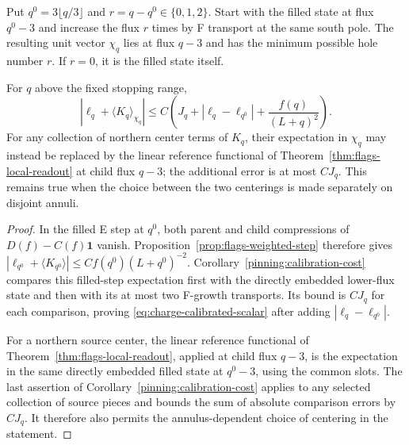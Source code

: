 Put $q^0=3\lfloor q/3\rfloor$ and $r=q-q^0\in\{0,1,2\}$.
Start with the filled state at flux $q^0-3$ and increase the flux
$r$ times by F transport at the same south pole.  The resulting unit
vector $\chi_q$ lies at flux $q-3$ and has the minimum possible hole
number $r$.  If $r=0$, it is the filled state itself.

\begin{lemma}\label{lem:charge-calibration}
For $q$ above the fixed stopping range,
\begin{equation}\label{eq:charge-calibrated-scalar}
 \left|\ell_q+\langle K_q\rangle_{\chi_q}\right|
 \le C\left(J_q+|\ell_q-\ell_{q^0}|
              +\frac{f(q)}{(L+q)^2}\right).
\end{equation}
For any collection of northern center terms of $K_q$, their expectation
in $\chi_q$ may instead be replaced by the linear reference functional
of Theorem~\ref{thm:flags-local-readout} at child flux $q-3$; the
additional error is at most $CJ_q$.  This remains true when the choice between the two centerings
is made separately on disjoint annuli.
\end{lemma}

\begin{proof}
In the filled E step at $q^0$, both parent and child compressions of
$D(f)-C(f)\mathbf1$ vanish.  Proposition~\ref{prop:flags-weighted-step}
therefore gives
$|\ell_{q^0}+\langle K_{q^0}\rangle|\le
C f(q^0)(L+q^0)^{-2}$.
Corollary~\ref{pinning:calibration-cost} compares this filled-step
expectation first with the directly embedded lower-flux state and then
with its at most two F-growth transports.  Its bound is $CJ_q$ for
each comparison, proving \eqref{eq:charge-calibrated-scalar} after
adding $|\ell_q-\ell_{q^0}|$.

For a northern source center, the linear reference functional of
Theorem~\ref{thm:flags-local-readout}, applied at child flux $q-3$, is
the expectation in the same directly embedded filled state at $q^0-3$,
using the common slots.
The last assertion of Corollary~\ref{pinning:calibration-cost} applies
to any selected collection of source pieces and bounds the sum of
absolute comparison errors by $CJ_q$.  It therefore also permits the
annulus-dependent choice of centering in the statement.
\end{proof}

